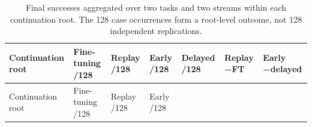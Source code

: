 \documentclass[10pt,letterpaper]{article}
\begin{document}
\begin{longtable}[]{@{}
  >{\raggedright\arraybackslash}p{}
  >{\raggedleft\arraybackslash}p{}
  >{\raggedleft\arraybackslash}p{}
  >{\raggedleft\arraybackslash}p{}
  >{\raggedleft\arraybackslash}p{}
  >{\raggedleft\arraybackslash}p{}
  >{\raggedleft\arraybackslash}p{}@{}}
\caption{Final successes aggregated over two tasks and two streams
within each continuation root. The 128 case occurrences form a
root-level outcome, not 128 independent replications.}\tabularnewline
\toprule\noalign{}
\begin{minipage}[b]{\linewidth}\raggedright
Continua\-tion root
\end{minipage} & \begin{minipage}[b]{\linewidth}\raggedleft
Fine-tuning /128
\end{minipage} & \begin{minipage}[b]{\linewidth}\raggedleft
Replay /128
\end{minipage} & \begin{minipage}[b]{\linewidth}\raggedleft
Early /128
\end{minipage} & \begin{minipage}[b]{\linewidth}\raggedleft
Delayed /128
\end{minipage} & \begin{minipage}[b]{\linewidth}\raggedleft
Replay −FT
\end{minipage} & \begin{minipage}[b]{\linewidth}\raggedleft
Early −delayed
\end{minipage} \\
\midrule\noalign{}
\endfirsthead
\toprule\noalign{}
\begin{minipage}[b]{\linewidth}\raggedright
Continua\-tion root
\end{minipage} & \begin{minipage}[b]{\linewidth}\raggedleft
Fine-tuning /128
\end{minipage} & \begin{minipage}[b]{\linewidth}\raggedleft
Replay /128
\end{minipage} & \begin{minipage}[b]{\linewidth}\raggedleft
Early /128
\end{minipage} & \begin{minipage}[b]{\linewidth}\raggedleft

\end{minipage}
\end{longtable}
\end{document}
